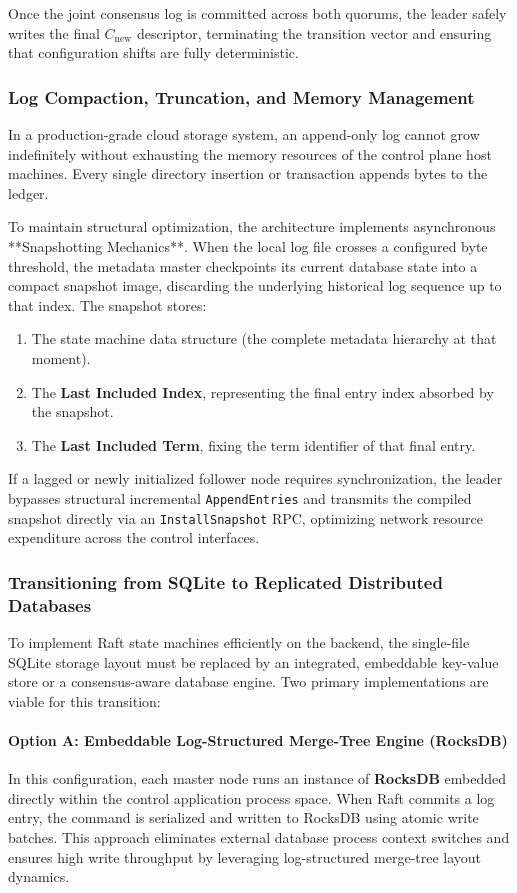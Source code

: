 Once the joint consensus log is committed across both quorums, the leader safely writes the final $C_{\text{new}}$ descriptor, terminating the transition vector and ensuring that configuration shifts are fully deterministic.

\subsubsection{Log Compaction, Truncation, and Memory Management}
In a production-grade cloud storage system, an append-only log cannot grow indefinitely without exhausting the memory resources of the control plane host machines. Every single directory insertion or transaction appends bytes to the ledger.

To maintain structural optimization, the architecture implements asynchronous **Snapshotting Mechanics**. When the local log file crosses a configured byte threshold, the metadata master checkpoints its current database state into a compact snapshot image, discarding the underlying historical log sequence up to that index. The snapshot stores:
\begin{enumerate}
    \item The state machine data structure (the complete metadata hierarchy at that moment).
    \item The \textbf{Last Included Index}, representing the final entry index absorbed by the snapshot.
    \item The \textbf{Last Included Term}, fixing the term identifier of that final entry.
\end{enumerate}
If a lagged or newly initialized follower node requires synchronization, the leader bypasses structural incremental \texttt{AppendEntries} and transmits the compiled snapshot directly via an \texttt{InstallSnapshot} RPC, optimizing network resource expenditure across the control interfaces.

\subsubsection{Transitioning from SQLite to Replicated Distributed Databases}
To implement Raft state machines efficiently on the backend, the single-file SQLite storage layout must be replaced by an integrated, embeddable key-value store or a consensus-aware database engine. Two primary implementations are viable for this transition:

\paragraph{Option A: Embeddable Log-Structured Merge-Tree Engine (RocksDB)}
In this configuration, each master node runs an instance of \textbf{RocksDB} embedded directly within the control application process space. When Raft commits a log entry, the command is serialized and written to RocksDB using atomic write batches. This approach eliminates external database process context switches and ensures high write throughput by leveraging log-structured merge-tree layout dynamics.

